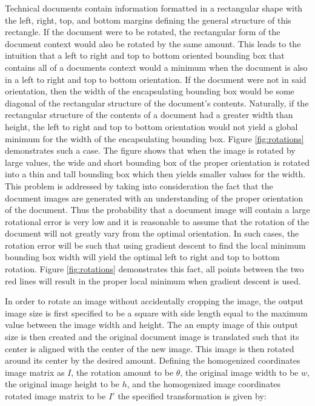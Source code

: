 \documentclass[12pt]{IEEEtran}
\begin{document}
Technical documents contain information formatted in a rectangular shape with the left, right, top, and bottom margins defining the general structure of this rectangle. If the document were to be rotated, the rectangular form of the document context would also be rotated by the same amount. This leads to the intuition that a left to right and top to bottom oriented bounding box that contains all of a documents context would a minimum when the document is also in a left to right and top to bottom orientation. If the document were not in said orientation, then the width of the encapsulating bounding box would be some diagonal of the rectangular structure of the document's contents. Naturally, if the rectangular structure of the contents of a document had a greater width than height, the left to right and top to bottom orientation would not yield a global minimum for the width of the encapsulating bounding box. Figure \ref{fig:rotations} demonstrates such a case. The figure shows that when the image is rotated by large values, the wide and short bounding box of the proper orientation is rotated into a thin and tall bounding box which then yields smaller values for the width. This problem is addressed by taking into consideration the fact that the document images are generated with an understanding of the proper orientation of the document. Thus the probability that a document image will contain a large rotational error is very low and it is reasonable to assume that the rotation of the document will not greatly vary from the optimal orientation. In such cases, the rotation error will be such that using gradient descent to find the local minimum bounding box width will yield the optimal left to right and top to bottom rotation. Figure \ref{fig:rotations} demonstrates this fact, all points between the two red lines will result in the proper local minimum when gradient descent is used.

In order to rotate an image without accidentally cropping the image, the output image size is first specified to be a square with side length equal to the maximum value between the image width and height. The an empty image of this output size is then created and the original document image is translated such that its center is aligned with the center of the new image. This image is then rotated around its center by the desired amount. Defining the homogenized coordinates image matrix as $I$, the rotation amount to be $\theta$, the original image width to be $w$, the original image height to be $h$, and the homogenized image coordinates rotated image matrix to be $I'$ the specified transformation is given by:
\end{document}
